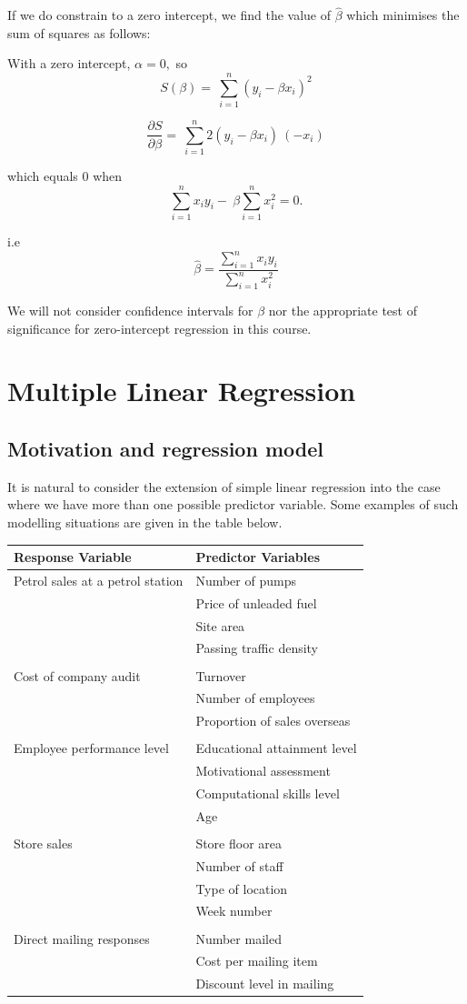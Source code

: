 \documentclass[12pt,a4paper,openany,twoside]{report}
\theoremstyle{definition}
\theoremstyle{remark}
\theoremstyle{plain}
\theoremstyle{definition}
\theoremstyle{definition}
\theoremstyle{definition}
\theoremstyle{remark}
\begin{document}
\newpage

If we do constrain to a zero intercept, we find the value of
\(\hat{\beta}\) which minimises the sum of squares as follows:

With a zero intercept, \(\alpha = 0,\) so
\[S(\beta) = \ \sum_{i = 1}^{n}{(y_{i} - \beta x_{i})^{2}}\]

\[\frac{\partial S}{\partial\beta} = \ \sum_{i = 1}^{n}{2(y_{i} - \beta x_{i})\ {( - x_{i})}^{}}\]

which equals 0 when
\[\sum_{i = 1}^{n}{x_{i}y_{i}} - \ \beta\sum_{i = 1}^{n}{x_{i}^{2} = 0.}\]

i.e
\[\hat{\beta} = \frac{\sum_{i = 1}^{n}{x_{i}y_{i}}}{\sum_{i = 1}^{n}x_{i}^{2}}\]

We will not consider confidence intervals for \(\beta\) nor the
appropriate test of significance for zero-intercept regression in this
course.

\hypertarget{mlr}{%
\chapter{Multiple Linear Regression}\label{mlr}}

\hypertarget{mlrmotivation}{%
\section{Motivation and regression model}\label{mlrmotivation}}

It is natural to consider the extension of simple linear regression into the case where we have more than one possible predictor variable. Some examples of such modelling situations are given in the table below.

\begin{longtable}[c]{@{}ll@{}}
\toprule
Response Variable & Predictor
Variables\tabularnewline
\midrule
\endhead
Petrol sales at a petrol station & Number of
pumps\tabularnewline
& Price of unleaded fuel\tabularnewline
& Site area\tabularnewline
& Passing traffic density\tabularnewline
&\tabularnewline
Cost of company audit & Turnover\tabularnewline
& Number of employees\tabularnewline
& Proportion of sales overseas\tabularnewline
&\tabularnewline
Employee performance level & Educational attainment
level\tabularnewline
& Motivational assessment\tabularnewline
& Computational skills level\tabularnewline
& Age\tabularnewline
&\tabularnewline
Store sales & Store floor area\tabularnewline
& Number of staff\tabularnewline
& Type of location\tabularnewline
& Week number\tabularnewline
&\tabularnewline
Direct mailing responses & Number mailed\tabularnewline
& Cost per mailing item\tabularnewline
& Discount level in mailing\tabularnewline
\bottomrule
\end{longtable}
\end{document}

